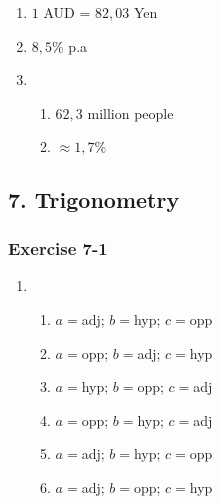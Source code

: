 {\begin{multicols}{3}
\begin{enumerate}[label=\textbf{\arabic*}.]
	\item $1$ AUD = $82,03$ Yen%

	\item $8,5\%$ p.a%

\item
\begin{enumerate}[noitemsep, label=\textbf{(\alph*)} ]
    \item $62,3$ million people
    \item $\approx 1,7\%$
\end{enumerate}

    \end{enumerate}


\end{multicols}

\subsection* {7. Trigonometry}
\begin{multicols}{3}
\subsubsection*{Exercise 7-1} %

\begin{enumerate}[noitemsep, label=\textbf{\arabic*}. ]
\item %
\begin{enumerate}[noitemsep, label=\textbf{(\alph*)} ]
\item $a=$adj; $b=$hyp; $c=$opp
\item $a=$opp; $b=$adj; $c=$hyp
\item $a=$hyp; $b=$opp; $c=$adj
\item $a=$opp; $b=$hyp; $c=$adj
\item $a=$adj; $b=$hyp; $c=$opp
\item $a=$adj; $b=$opp; $c=$hyp
\end{enumerate}




\end{enumerate}
\end{multicols}}
